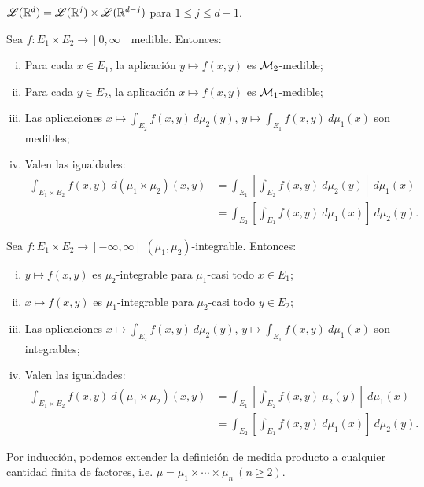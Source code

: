 \begin{eg}
	$\mathscr{L}(\mathbb{R}^{d}) = \mathscr{L}(\mathbb{R}^{j}) \times \mathscr{L}(\mathbb{R}^{d-j})$ para $1 \leq j \leq d-1$.
\end{eg}

\begin{theorem}
	Sea $f \colon E_{1} \times E_{2} \to [0,\infty]$ medible. Entonces:
	\begin{enumerate}[i)]
		\item Para cada $x \in E_{1}$, la aplicación $y \mapsto f(x,y)$ es $\mathcal{M}_{2}$-medible;

		\item Para cada $y \in E_{2}$, la aplicación $x \mapsto f(x,y)$ es $\mathcal{M}_{1}$-medible;

		\item Las aplicaciones $x \mapsto \int_{E_{2}} f(x,y) \ d\mu_{2}(y)$, $y \mapsto \int_{E_{1}} f(x,y) \ d\mu_{1}(x)$ son medibles;

		\item Valen las igualdades:
		\begin{align*}
			\int_{E_{1} \times E_{2}} f(x,y) \ d(\mu_{1} \times \mu_{2})(x,y) &= \int_{E_{1}} \left[ \int_{E_{2}} f(x,y) \ d\mu_{2}(y) \right] \ d\mu_{1}(x) \\
			&= \int_{E_{2}} \left[ \int_{E_{1}} f(x,y) \ d\mu_{1}(x) \right] \ d\mu_{2}(y)
		.\end{align*}
	\end{enumerate}
\end{theorem}

\begin{theorem}[Fubini]
	Sea $f \colon E_{1} \times E_{2} \to [-\infty,\infty]$ $(\mu_{1},\mu_{2})$-integrable. Entonces:
	\begin{enumerate}[i)]
		\item $y \mapsto f(x,y)$ es $\mu_{2}$-integrable para $\mu_{1}$-casi todo $x \in E_{1}$;

		\item $x \mapsto f(x,y)$ es $\mu_{1}$-integrable para $\mu_{2}$-casi todo $y \in E_{2}$;

		\item Las aplicaciones $x \mapsto \int_{E_{2}} f(x,y) \ d\mu_{2}(y)$, $y \mapsto \int_{E_{1}} f(x,y) \ d\mu_{1}(x)$ son integrables;

		\item Valen las igualdades:
		\begin{align*}
			\int_{E_{1} \times E_{2}} f(x,y) \ d(\mu_{1} \times \mu_{2})(x,y) &= \int_{E_{1}} \left[ \int_{E_{2}} f(x,y) \ \mu_{2}(y) \right] \ d\mu_{1}(x) \\
			&= \int_{E_{2}} \left[ \int_{E_{1}} f(x,y) \ d\mu_{1}(x) \right] \ d\mu_{2}(y)
		.\end{align*}
	\end{enumerate}
\end{theorem}
\medskip \par
Por inducción, podemos extender la definición de medida producto a cualquier cantidad finita de factores, i.e. $\mu = \mu_{1} \times \cdots \times \mu_{n} \ (n \geq 2)$.

